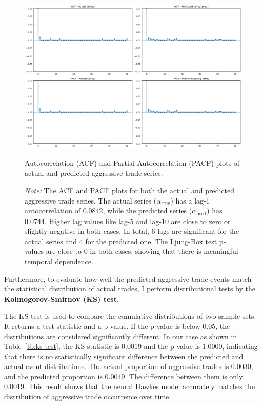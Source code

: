 
\begin{figure}[H]
    \centering
    \includegraphics[width=0.95\linewidth]{figures/ACF_181330.png}
    \caption{Autocorrelation (ACF) and Partial Autocorrelation (PACF) plots of actual and predicted aggressive trade series.}
    \caption*{\textit{Note:} The ACF and PACF plots for both the actual and predicted aggressive trade series. The actual series ($\bar{\alpha}_\text{true}$) has a lag-1 autocorrelation of 0.0842, while the predicted series ($\bar{\alpha}_\text{pred}$) has 0.0744. Higher lag values like lag-5 and lag-10 are close to zero or slightly negative in both cases. In total, 6 lags are significant for the actual series and 4 for the predicted one. The Ljung-Box test p-values are close to 0 in both cases, showing that there is meaningful temporal dependence.}
    \label{fig:acf-pacf}
\end{figure}



Furthermore, to evaluate how well the predicted aggressive trade events match the statistical distribution of actual trades, I perform distributional tests by the \textbf{Kolmogorov-Smirnov (KS) test}. 

The KS test is used to compare the cumulative distributions of two sample sets. It returns a test statistic and a p-value. If the p-value is below 0.05, the distributions are considered significantly different. In our case as shown in Table~\ref{tb:ks-test}, the KS statistic is 0.0019 and the p-value is 1.0000, indicating that there is no statistically significant difference between the predicted and actual event distributions. The actual proportion of aggressive trades is 0.0030, and the predicted proportion is 0.0049. The difference between them is only 0.0019. This result shows that the neural Hawkes model accurately matches the distribution of aggressive trade occurrence over time.


